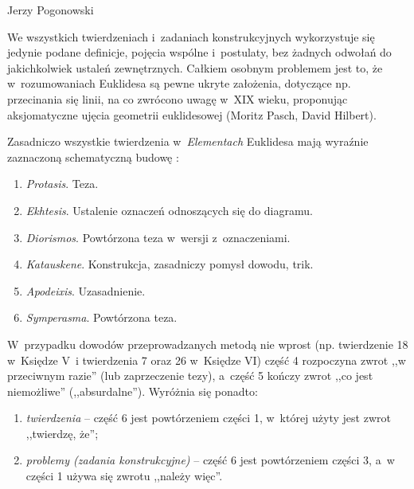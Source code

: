 \begin{newrevplenv}{Jerzy Pogonowski}
\begin{enumerate}
\end{enumerate}

We wszystkich twierdzeniach i~zadaniach konstrukcyjnych
wykorzystuje się jedynie podane definicje, pojęcia wspólne i~postulaty, bez żadnych odwołań do jakichkolwiek ustaleń
zewnętrznych. Całkiem osobnym problemem jest to, że w~rozumowaniach Euklidesa są pewne ukryte założenia, dotyczące np.
przecinania się linii, na co zwrócono uwagę w~XIX wieku,
proponując aksjomatyczne ujęcia geometrii euklidesowej (Moritz
Pasch, David Hilbert).

Zasadniczo wszystkie twierdzenia w~{\em Elementach} Euklidesa mają
wyraźnie zaznaczoną schematyczną budowę \parencite[s.~122--123]{euklides_elementy_2013}:

\begin{enumerate}

\item {\em Protasis}. Teza.

\item {\em Ekhtesis}. Ustalenie oznaczeń odnoszących się do
diagramu.

\item {\em Diorismos}. Powtórzona teza w~wersji z~oznaczeniami.

\item {\em Katauskene}. Konstrukcja, zasadniczy pomysł dowodu,
trik.

\item {\em Apodeixis}. Uzasadnienie.

\item {\em Symperasma}. Powtórzona teza.

\end{enumerate}

W~przypadku dowodów przeprowadzanych metodą nie wprost (np.
twierdzenie 18 w~Księdze V~i twierdzenia 7 oraz 26 w~Księdze VI)
część 4 rozpoczyna zwrot ,,w przeciwnym razie'' (lub zaprzeczenie
tezy), a~część 5 kończy zwrot ,,co jest niemożliwe''
(,,absurdalne''). Wyróżnia się ponadto:

\begin{enumerate}

\item {\em twierdzenia} -- część 6 jest powtórzeniem części 1, w~której użyty jest zwrot ,,twierdzę, że'';

\item {\em problemy (zadania konstrukcyjne)} -- część 6 jest
powtórzeniem części 3, a~w części 1 używa się zwrotu ,,należy
więc''.

\end{enumerate}


\end{newrevplenv}
